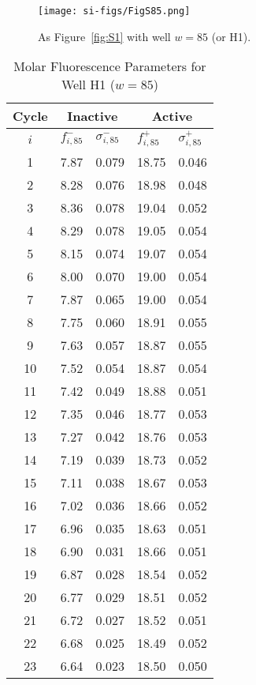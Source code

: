                 \begin{figure}
                    \centering
                    \texttt{[image: si-figs/FigS85.png]}
                    \caption{
                        As Figure~\ref{fig:S1} with well $w=85$ (or H1).
                    }
                \end{figure}
                \clearpage
    \begin{table}
        \caption{Molar Fluorescence Parameters for Well H1 ($w=85$)}
        \centering
        \begin{tabular}{c|ll|ll}
            Cycle & \multicolumn{2}{c|}{Inactive} & \multicolumn{2}{c}{Active} \\
            \hline
            $i$ & $f_{i,85}^{-}$ & $\sigma_{i,85}^{-}$ &  $f_{i,85}^{+}$ & $\sigma_{i,85}^{+}$ \\
            \hline
    1 & 7.87 & 0.079 & 18.75 & 0.046 \\
2 & 8.28 & 0.076 & 18.98 & 0.048 \\
3 & 8.36 & 0.078 & 19.04 & 0.052 \\
4 & 8.29 & 0.078 & 19.05 & 0.054 \\
5 & 8.15 & 0.074 & 19.07 & 0.054 \\
6 & 8.00 & 0.070 & 19.00 & 0.054 \\
7 & 7.87 & 0.065 & 19.00 & 0.054 \\
8 & 7.75 & 0.060 & 18.91 & 0.055 \\
9 & 7.63 & 0.057 & 18.87 & 0.055 \\
10 & 7.52 & 0.054 & 18.87 & 0.054 \\
11 & 7.42 & 0.049 & 18.88 & 0.051 \\
12 & 7.35 & 0.046 & 18.77 & 0.053 \\
13 & 7.27 & 0.042 & 18.76 & 0.053 \\
14 & 7.19 & 0.039 & 18.73 & 0.052 \\
15 & 7.11 & 0.038 & 18.67 & 0.053 \\
16 & 7.02 & 0.036 & 18.66 & 0.052 \\
17 & 6.96 & 0.035 & 18.63 & 0.051 \\
18 & 6.90 & 0.031 & 18.66 & 0.051 \\
19 & 6.87 & 0.028 & 18.54 & 0.052 \\
20 & 6.77 & 0.029 & 18.51 & 0.052 \\
21 & 6.72 & 0.027 & 18.52 & 0.051 \\
22 & 6.68 & 0.025 & 18.49 & 0.052 \\
23 & 6.64 & 0.023 & 18.50 & 0.050 \\

\end{tabular}
\end{table}
